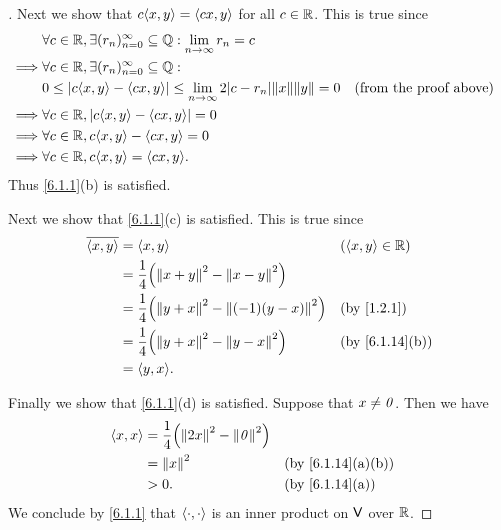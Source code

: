 \begin{proof}[]
  Next we show that \(c \inn{x, y} = \inn{cx, y}\) for all \(c \in \mathbb{R}\).
  This is true since
  \begin{align*}
             & \forall c \in \R, \exists (r_n)_{n = 0}^\infty \subseteq \Q : \lim_{n \to \infty} r_n = c                                                 \\
    \implies & \forall c \in \R, \exists (r_n)_{n = 0}^\infty \subseteq \Q :                                                                             \\
             & 0 \leq \abs{c \inn{x, y} - \inn{cx, y}} \leq \lim_{n \to \infty} 2 \abs{c - r_n} \norm{x} \norm{y} = 0 &  & \text{(from the proof above)} \\
    \implies & \forall c \in \R, \abs{c \inn{x, y} - \inn{cx, y}} = 0                                                                                    \\
    \implies & \forall c \in \R, c \inn{x, y} - \inn{cx, y} = 0                                                                                          \\
    \implies & \forall c \in \R, c \inn{x, y} = \inn{cx, y}.
  \end{align*}
  Thus \cref{6.1.1}(b) is satisfied.

  Next we show that \cref{6.1.1}(c) is satisfied.
  This is true since
  \begin{align*}
    \conj{\inn{x, y}} & = \inn{x, y}                                              &  & (\inn{x, y} \in \R)          \\
                      & = \frac{1}{4} \pa{\norm{x + y}^2 - \norm{x - y}^2}                                          \\
                      & = \frac{1}{4} \pa{\norm{y + x}^2 - \norm{(-1) (y - x)}^2} &  & \text{(by \cref{1.2.1})}     \\
                      & = \frac{1}{4} \pa{\norm{y + x}^2 - \norm{y - x}^2}        &  & \text{(by \cref{6.1.14}(b))} \\
                      & = \inn{y, x}.
  \end{align*}

  Finally we show that \cref{6.1.1}(d) is satisfied.
  Suppose that \(x \neq \mathit{0}\).
  Then we have
  \begin{align*}
    \inn{x, x} & = \frac{1}{4} \pa{\norm{2x}^2 - \norm{\zv}^2}                                      \\
               & = \norm{x}^2                                  &  & \text{(by \cref{6.1.14}(a)(b))} \\
               & > 0.                                          &  & \text{(by \cref{6.1.14}(a))}
  \end{align*}
  We conclude by \cref{6.1.1} that \(\left\langle\cdot, \cdot\right\rangle\) is an inner product on \(\mathsf{V}\) over \(\mathbb{R}\).
\end{proof}

